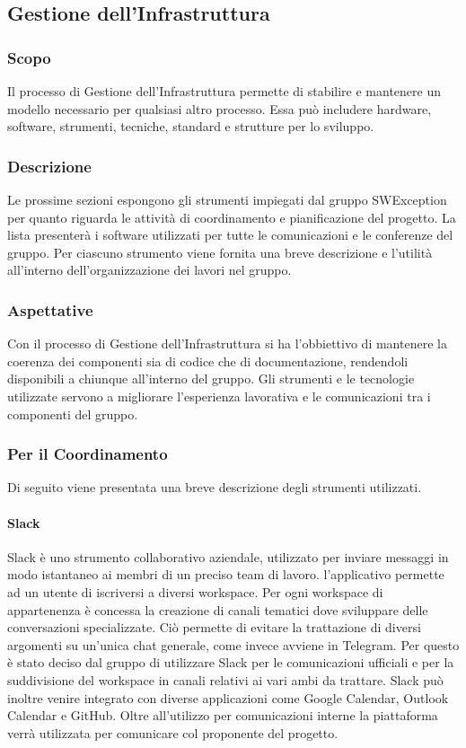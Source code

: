 \subsection{Gestione dell'Infrastruttura} \label{_gestioneInfrastruttura}
\subsubsection{Scopo}
Il processo di Gestione dell'Infrastruttura permette di stabilire e mantenere un modello necessario per qualsiasi altro processo. Essa può includere hardware, software, strumenti, tecniche, standard e strutture per lo sviluppo.

\subsubsection{Descrizione}
Le prossime sezioni espongono gli strumenti impiegati dal gruppo SWException per quanto riguarda le attività di coordinamento e pianificazione del progetto. La lista presenterà i software utilizzati per tutte le comunicazioni e le conferenze del gruppo. Per ciascuno strumento viene fornita una breve descrizione e l'utilità all'interno dell'organizzazione dei lavori nel gruppo.

\subsubsection{Aspettative}
Con il processo di Gestione dell'Infrastruttura si ha l'obbiettivo di mantenere la coerenza dei componenti sia di codice che di documentazione, rendendoli disponibili a chiunque all'interno del gruppo. Gli strumenti e le tecnologie utilizzate servono a migliorare l'esperienza lavorativa e le comunicazioni tra i componenti del gruppo.


\subsubsection{Per il Coordinamento}
Di seguito viene presentata una breve descrizione degli strumenti utilizzati.

\paragraph{Slack}
Slack è uno strumento collaborativo aziendale, utilizzato per inviare messaggi in modo istantaneo ai membri di un preciso team di lavoro. l'applicativo permette ad un utente di iscriversi
a diversi workspace. Per ogni workspace di appartenenza è concessa la creazione di canali
tematici dove sviluppare delle conversazioni specializzate. Ciò permette di evitare la trattazione di diversi argomenti su un'unica chat generale, come invece avviene in Telegram. Per questo è stato deciso dal gruppo di utilizzare Slack per le comunicazioni ufficiali e per la suddivisione del workspace in canali relativi ai vari ambi da trattare. Slack può inoltre venire integrato con diverse applicazioni come Google Calendar, Outlook Calendar e GitHub. Oltre all'utilizzo per comunicazioni interne la piattaforma verrà utilizzata per comunicare col proponente del progetto.

